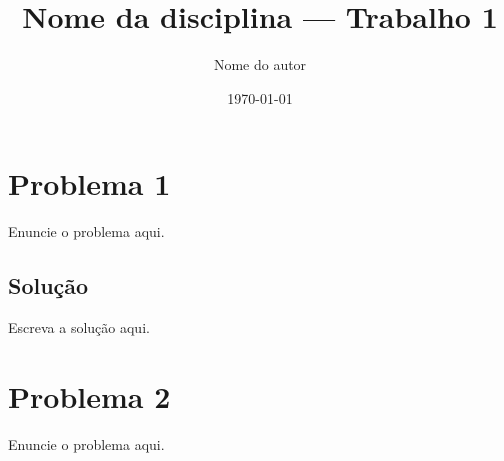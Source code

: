 \documentclass[11pt]{article}
\title{Nome da disciplina — Trabalho 1}
\author{Nome do autor}
\date{\today}
\begin{document}
\maketitle

\section*{Problema 1}
Enuncie o problema aqui.

\subsection*{Solução}
Escreva a solução aqui.

\section*{Problema 2}
Enuncie o problema aqui.
\end{document}
